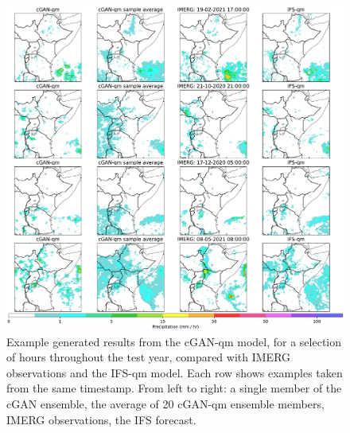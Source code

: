 \documentclass[../main.tex]{subfiles}
\begin{document}
\begin{figure}[ht!]
     \centering
     \includegraphics[width=1.05\textwidth]{images/cGAN_samples_IFS_final-nologs_217600.pdf}
     
     \caption{Example generated results from the cGAN-qm model, for a selection of hours throughout the test year, compared with IMERG observations and the IFS-qm model. Each row shows examples taken from the same timestamp. From left to right: a single member of the cGAN ensemble, the average of 20 cGAN-qm ensemble members, IMERG observations, the IFS forecast. }
     \label{fig:examples}
\end{figure}
\end{document}
